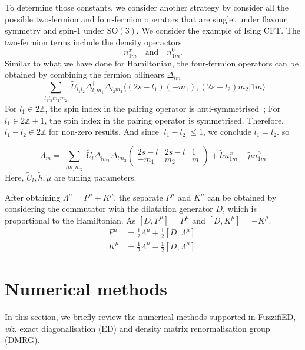 \documentclass{timesjhep}
\begin{document}
To determine those constants, we consider another strategy by consider all the possible two-fermion and four-fermion operators that are singlet under flavour symmetry and spin-1 under $\mathrm{SO}(3)$. We consider the example of Ising CFT. The two-fermion terms include the density operactors 
\begin{equation*}
    n^x_{1m}\quad\textrm{and}\quad n^0_{1m}.
\end{equation*}
Similar to what we have done for Hamiltonian, the four-fermion operators can be obtained by combining the fermion bilinears $\Delta_{lm}$ 
\begin{equation}
    \sum_{\substack{l_1l_2m_1m_2}}\tilde{U}_{l_1l_2}\Delta^\dagger_{l_1m_1}\Delta_{l_2m_2}\langle (2s-l_1)(-m_1),(2s-l_2)m_2|1m\rangle
\end{equation} 
For $l_1\in2\mathbb{Z}$, the spin index in the pairing operator is anti-symmetrised~; For $l_1\in2\mathbb{Z}+1$, the spin index in the pairing operator is symmetrised. Therefore, $l_1-l_2\in2\mathbb{Z}$ for non-zero results. And since $|l_1-l_2|\leq 1$, we conclude $l_1=l_2$. so 

\begin{equation}
    \Lambda_m=\sum_{\substack{lm_1m_2}}\tilde{U}_{l}\Delta^\dagger_{lm_1}\Delta_{lm_2}\begin{pmatrix}2s-l&2s-l&1\\-m_1&m_2&m     \end{pmatrix}+\tilde{h}n^x_{1m}+\tilde{\mu}n^0_{1m} 
\end{equation}
Here, $\tilde{U}_l,\tilde{h},\tilde{\mu}$ are tuning parameters. 

After obtaining $\Lambda^\mu=P^\mu+K^\mu$, the separate $P^\mu$ and $K^\mu$ can be obtained by considering the commutator with the dilatation generator $D$, which is proportional to the Hamiltonian. As $[D,P^\mu]=P^\mu$ and $[D,K^\mu]=-K^\mu$.
\begin{align}
    P^\mu&=\tfrac{1}{2}\Lambda^\mu+\tfrac{1}{2}[D,\Lambda^\mu]\nonumber\\
    K^\mu&=\tfrac{1}{2}\Lambda^\mu-\tfrac{1}{2}[D,\Lambda^\mu].
\end{align} 

\section{Numerical methods}
\label{sec:numerics}

In this section, we briefly review the numerical methods supported in FuzzifiED, \textit{viz.} exact diagonalisation (ED) and density matrix renormalisation group (DMRG).
\end{document}
